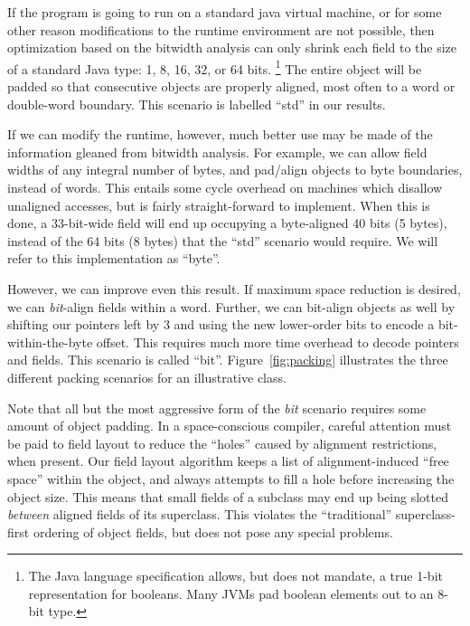 \documentclass[preprint]{acmconf}
\begin{document}
If the program is going to run on a standard java virtual machine, or
for some other reason modifications to the runtime environment are not
possible, then optimization based on the bitwidth analysis can only
shrink each field to the size of a standard Java type: 1,
8, 16, 32, or 64 bits.%
\footnote{The Java language specification allows, but does not mandate,
  a true 1-bit representation for booleans.  Many JVMs pad boolean
  elements out to an 8-bit type.}
The entire object will be padded so that
consecutive objects are properly aligned, most often to a word or
double-word boundary.  This scenario is labelled ``std'' in our results.

If we can modify the runtime, however, much better use may be made of
the information gleaned from bitwidth analysis.  For example, we can
allow field widths of any integral number of bytes, and pad/align
objects to byte boundaries, instead of words.  This entails some
cycle overhead on machines which disallow unaligned accesses, but is
fairly straight-forward to implement.  When this is done,
a 33-bit-wide field will
end up occupying a byte-aligned 40 bits (5 bytes), instead of the 64
bits (8 bytes) that the ``std'' scenario would require.  We will refer
to this implementation as ``byte''.

However, we can improve even this result.  If maximum space reduction
is desired, we can {\it bit}-align fields within a word.  Further, we
can bit-align objects as well by shifting our pointers left by 3 and
using the new lower-order bits to encode a bit-within-the-byte offset.
This requires much more time overhead to decode pointers and fields.
This scenario is called ``bit''.
%
Figure~\ref{fig:packing} illustrates the three different packing
scenarios for an illustrative class.

Note that all but the most aggressive form of the {\it bit} scenario
requires some amount of object padding.  In a space-conscious
compiler, careful attention must be paid to field layout to reduce
the ``holes'' caused by alignment restrictions, when present.  Our
field layout algorithm keeps a list of alignment-induced ``free
space'' within the object, and always attempts to fill a hole before
increasing the object size.  This means that small fields of a
subclass may end up being slotted {\it between} aligned fields of its
superclass.  This violates the ``traditional'' superclass-first
ordering of object fields, but does not pose any special problems.
\end{document}
